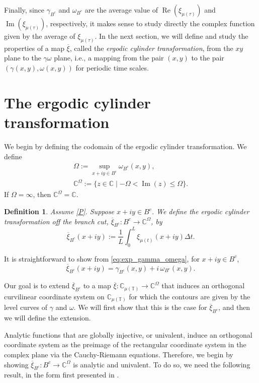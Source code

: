 \documentclass[10pt,a4paper]{amsart}
\DeclareMathOperator{\myRe}{Re}
\DeclareMathOperator{\myIm}{Im}
\numberwithin{equation}{section}
\newtheorem{definition}[theorem]{Definition}
\begin{document}
Finally, since $\gamma_{B^c}$ and $\omega_{B^c}$ are the average value of
$\myRe(\xi_{\mu(\tau)})$ and $\myIm(\xi_{\mu(\tau)})$, respectively, it makes sense to
study directly the complex function given by the average of $\xi_{\mu(\tau)}$.
In the next section, we will define and study the properties of a map $\overline{\xi}$,
called the \emph{ergodic cylinder transformation}, from the $xy$ plane to the
$\gamma \omega$ plane, i.e., a mapping from the pair $(x,y)$ to the pair
$(\gamma(x,y),\omega(x,y))$ for periodic time scales.


\section{The ergodic cylinder transformation}

We begin by defining the codomain of the ergodic cylinder transformation. We define
 \begin{gather*}
 \Omega := \sup_{x+iy \in B^c} \omega_{B^c}(x,y),\\
 \mathbb{C}^{\Omega} := \{z \in \mathbb{C} \mid -\Omega< \myIm(z) \leq \Omega\}.
 \end{gather*}
If $\Omega=\infty$, then $\mathbb{C}^{\Omega} = \mathbb{C}$.

\begin{definition}
\label{def:xibarBc} \rm
Assume \eqref{P}. Suppose $x+iy\in B^c$. We define the \emph{ergodic cylinder
 transformation off the branch cut}, $\overline{\xi}_{B^c}: B^c \to \mathbb{C}^{\Omega}$, by
$$
 \overline{\xi}_{B^c}(x+iy):=\frac{1}{L}\int_{0}^{L} \xi_{\mu(t)}(x+iy) \Delta t.
$$
\end{definition}

It is straightforward to show from \eqref{eq:exp_gamma_omega}, for $x+iy \in B^c$,
\begin{equation} \label{eq:gamOm}
 \overline{\xi}_{B^c}(x+iy) = \gamma_{B^c}(x,y) + i\,\omega_{B^c}(x,y).
\end{equation}

Our goal is to extend $\overline{\xi}_{B^c}$ to a map $\overline{\xi}:\mathbb{C}_{\mu(\mathbb{T})} \to \mathbb{C}^{\Omega}$
that induces an orthogonal curvilinear coordinate system on $\mathbb{C}_{\mu(\mathbb{T})}$ for which
the contours are given by the level curves of $\gamma$ and $\omega$. We will first show
that this is the case for $\overline{\xi}_{B^c}$, and then we will define the extension.

Analytic functions that are globally injective, or univalent, induce an orthogonal
coordinate system as the preimage of the rectangular coordinate system in the complex
plane via the Cauchy-Riemann equations. Therefore, we begin by showing
$\overline{\xi}_{B^c}:B^c \to \mathbb{C}^{\Omega}$ is analytic and univalent. To do so, we need the
following result, in the form first presented in \cite[Theorem~8]{AvAk}.
\end{document}
